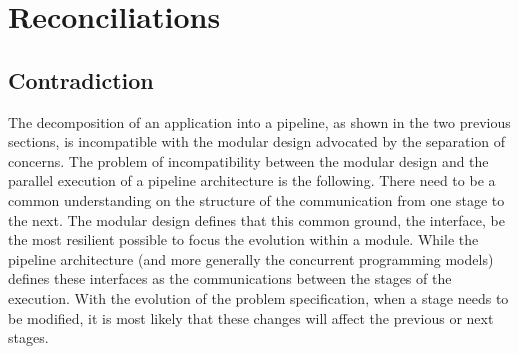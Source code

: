 








\section{Reconciliations} \label{chapter3:reconciliations}

\subsection{Contradiction}

The decomposition of an application into a pipeline, as shown in the two previous sections, is incompatible with the modular design advocated by the separation of concerns.
The problem of incompatibility between the modular design and the parallel execution of a pipeline architecture is the following.
There need to be a common understanding on the structure of the communication from one stage to the next.
The modular design defines that this common ground, the interface, be the most resilient possible to focus the evolution within a module.
While the pipeline architecture (and more generally the concurrent programming models) defines these interfaces as the communications between the stages of the execution.
With the evolution of the problem specification, when a stage needs to be modified, it is most likely that these changes will affect the previous or next stages.

